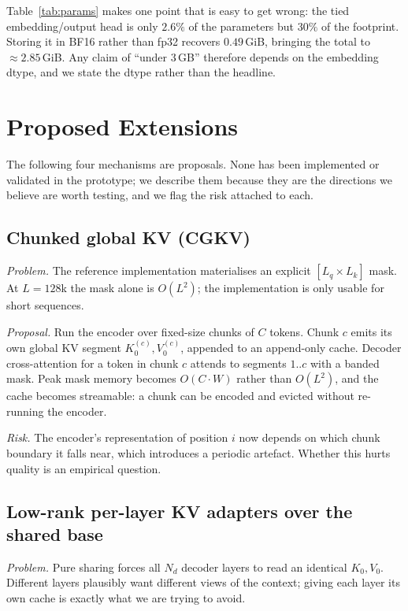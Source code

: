 \documentclass[10pt,conference]{IEEEtran}
\begin{document}
Table~\ref{tab:params} makes one point that is easy to get wrong: the tied
embedding/output head is only $2.6\%$ of the parameters but $30\%$ of the footprint.
Storing it in BF16 rather than fp32 recovers $0.49$\,GiB, bringing the total to
$\approx 2.85$\,GiB. Any claim of ``under 3\,GB'' therefore depends on the embedding
dtype, and we state the dtype rather than the headline.

\section{Proposed Extensions}\label{sec:ext}

The following four mechanisms are proposals. None has been implemented or validated in
the prototype; we describe them because they are the directions we believe are worth
testing, and we flag the risk attached to each.

\subsection{Chunked global KV (CGKV)}

\emph{Problem.} The reference implementation materialises an explicit $[L_q \times L_k]$
mask. At $L=128$k the mask alone is $O(L^2)$; the implementation is only usable for
short sequences.

\emph{Proposal.} Run the encoder over fixed-size chunks of $C$ tokens. Chunk $c$ emits
its own global KV segment $K_0^{(c)}, V_0^{(c)}$, appended to an append-only cache.
Decoder cross-attention for a token in chunk $c$ attends to segments $1..c$ with a
banded mask. Peak mask memory becomes $O(C \cdot W)$ rather than $O(L^2)$, and the
cache becomes streamable: a chunk can be encoded and evicted without re-running the
encoder.

\emph{Risk.} The encoder's representation of position $i$ now depends on which chunk
boundary it falls near, which introduces a periodic artefact. Whether this hurts
quality is an empirical question.

\subsection{Low-rank per-layer KV adapters over the shared base}

\emph{Problem.} Pure sharing forces all $N_d$ decoder layers to read an identical
$K_0, V_0$. Different layers plausibly want different views of the context; giving each
layer its own cache is exactly what we are trying to avoid.
\end{document}
